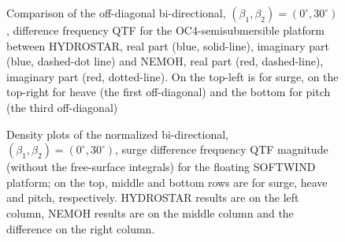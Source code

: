 \documentclass[12pt,a4paper,titlepage]{article}
\begin{document}
\begin{figure}[ht!]
{}
	\caption{Comparison of the off-diagonal bi-directional, $(\beta_1,\beta_2)=(0^{\circ},30^{\circ})$, difference frequency QTF for the OC4-semisubmersible platform between HYDROSTAR, real part (blue, solid-line), imaginary part (blue, dashed-dot line) and NEMOH, real part (red, dashed-line), imaginary part (red, dotted-line). On the top-left is for surge, on the top-right for heave (the first off-diagonal) and the bottom for pitch (the third off-diagonal)}\label{fig:QTFM_diag_OC4}
\end{figure}

\begin{figure}[ht!]
	\centering
{}
	\caption{Density plots of the normalized bi-directional, $(\beta_1,\beta_2)=(0^{\circ},30^{\circ})$, surge difference frequency QTF magnitude (without the free-surface integrals) for the floating SOFTWIND platform; on the top, middle and bottom rows are for surge, heave and pitch, respectively. HYDROSTAR results are on the left column, NEMOH results are on the middle column and the difference on the right column.}\label{fig:QTFM_SOFTWIND}
\end{figure}
\end{document}
